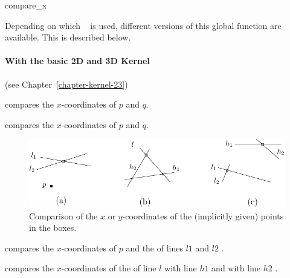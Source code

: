 \begin{ccRefFunction}{compare_x}

Depending on which \cgal\  is used,
different versions of this global function are available. This is
described below.

\paragraph{With the basic 2D and 3D Kernel} (see Chapter~\ref{chapter-kernel-23})

        {compares the $x$-coordinates of $p$ and $q$.}

        {compares the $x$-coordinates of $p$ and $q$.}

\begin{ccTexOnly}
\begin{figure}[hb]
\centerline{\includegraphics{Kernel_23_ref/fig/compare1}}
\caption{Comparison of the $x$ or $y$-coordinates of the (implicitly
given) points in the boxes.\label{fig-compare}}
\end{figure} 
\end{ccTexOnly} 

        {compares the $x$-coordinates of $p$ and the  
         of lines $l1$ and $l2$%
         .}


        {compares the $x$-coordinates of  the  of line $l$
         with line $h1$ and with line $h2$%
         .}



\end{ccRefFunction}
